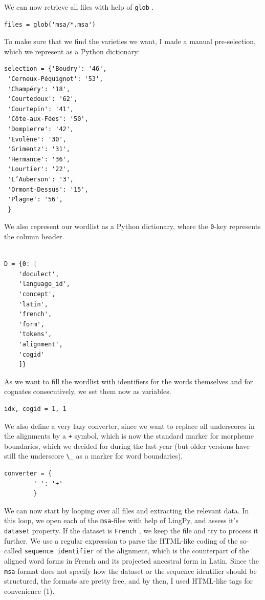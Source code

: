 \documentclass[
  a4paper,
  14pt,
  oneside,
  tablecaptionabove
]{scrbook}
\newcommand{\passthrough}[1]{#1}
\begin{document}
We can now retrieve all files with help of
\passthrough{\lstinline!glob!} .

\begin{lstlisting}
files = glob('msa/*.msa')
\end{lstlisting}

To make sure that we find the varieties we want, I made a manual
pre-selection, which we represent as a Python dictionary:

\begin{lstlisting}
selection = {'Boudry': '46',
 'Cerneux-Péquignot': '53',
 'Champéry': '18',
 'Courtedoux': '62',
 'Courtepin': '41',
 'Côte-aux-Fées': '50',
 'Dompierre': '42',
 'Evolène': '30',
 'Grimentz': '31',
 'Hermance': '36',
 'Lourtier': '22',
 'L’Auberson': '3',
 'Ormont-Dessus': '15',
 'Plagne': '56',
 }
\end{lstlisting}

We also represent our wordlist as a Python dictionary, where the
\passthrough{\lstinline!0!}-key represents the column header.\\
~\\

\begin{lstlisting}
D = {0: [
    'doculect',
    'language_id',
    'concept',
    'latin',
    'french',
    'form',
    'tokens',
    'alignment',
    'cogid'
    ]}
\end{lstlisting}

As we want to fill the wordlist with identifiers for the words
themselves and for cognates consecutively, we set them now as variables.

\begin{lstlisting}
idx, cogid = 1, 1
\end{lstlisting}

We also define a very lazy converter, since we want to replace all
underscores in the alignments by a \passthrough{\lstinline!+!} symbol,
which is now the standard marker for morpheme boundaries, which we
decided for during the last year (but older versions have still the
underscore \passthrough{\lstinline!\_!} as a marker for word
boundaries).

\begin{lstlisting}
converter = {
        '_': '+'
        }
\end{lstlisting}

We can now start by looping over all files and extracting the relevant
data. In this loop, we open each of the
\passthrough{\lstinline!msa!}-files with help of LingPy, and assess it's
\passthrough{\lstinline!dataset!} property. If the dataset is
\passthrough{\lstinline!French!} , we keep the file and try to process
it further. We use a regular expression to parse the HTML-like coding of
the so-called \passthrough{\lstinline!sequence identifier!} of the
alignment, which is the counterpart of the aligned word forms in French
and its projected ancestral form in Latin. Since the
\passthrough{\lstinline!msa!} format does not specify how the dataset or
the sequence identifier should be structured, the formats are pretty
free, and by then, I used HTML-like tags for convenience (1).
\end{document}
